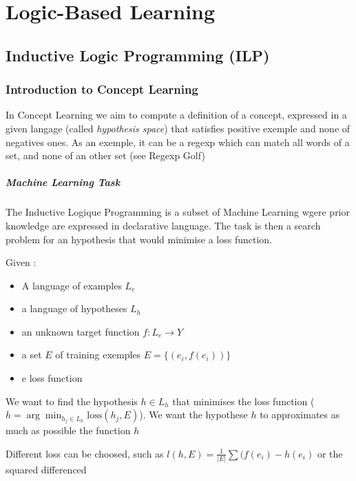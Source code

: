 \chapter{Logic-Based Learning} %
\label{cha: logic_learning}

	\section{Inductive Logic Programming (ILP)} %
	\label{sec:inductive_logic_programming}
		
		\subsection{Introduction to Concept Learning}

			In Concept Learning we aim to compute a definition of a concept, expressed in a given langage (called \emph{hypothesis space}) that satisfies positive exemple and none of negatives ones. As an exemple, it can be a regexp which can match all words of a set, and none of an other set (see Regexp Golf) 



		\paragraph*{Machine Learning Task}
			The Inductive Logique Programming is a subset of Machine Learning wgere prior knowledge are expressed in declarative language. The task is then a search problem for an hypothesis that would minimise a loss function.

		Given : 
		\begin{itemize}
			\item A language of examples $L_e$
			\item a language of hypotheses $L_h$
			\item an unknown target function $f: L_e \rightarrow Y$
			\item a set $E$ of training exemples $E = \{ (e_i, f(e_i))\} $
			\item e loss function
		\end{itemize}
		We want to find the hypothesis $h \in L_h$ that minimises the loss function ($h = \arg \min_{h_j \in L_h} \text{loss}(h_j, E)$). We want the hypothese $h$ to approximates as much as possible the function $h$

		Different loss can be choosed, such as $l(h, E) = \frac{1}{|E|}\sum (f(e_i) - h(e_i)$ or the squared differenced

